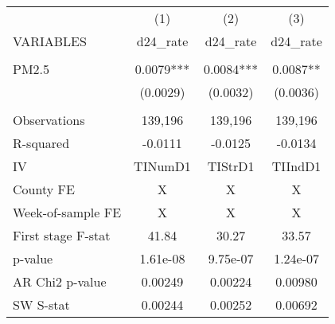 \begin{tabular}{lccc} \hline
 & (1) & (2) & (3) \\
VARIABLES & d24\_rate & d24\_rate & d24\_rate \\ \hline
 &  &  &  \\
PM2.5 & 0.0079*** & 0.0084*** & 0.0087** \\
 & (0.0029) & (0.0032) & (0.0036) \\
 &  &  &  \\
Observations & 139,196 & 139,196 & 139,196 \\
R-squared & -0.0111 & -0.0125 & -0.0134 \\
IV & TINumD1 & TIStrD1 & TIIndD1 \\
County FE & X & X & X \\
Week-of-sample FE & X & X & X \\
First stage F-stat & 41.84 & 30.27 & 33.57 \\
p-value & 1.61e-08 & 9.75e-07 & 1.24e-07 \\
AR Chi2 p-value & 0.00249 & 0.00224 & 0.00980 \\
 SW S-stat & 0.00244 & 0.00252 & 0.00692 \\ \hline
\end{tabular}
